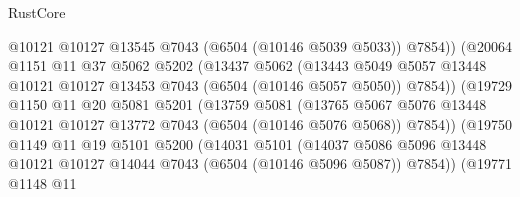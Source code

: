 \begin{lexlean}{RustCore}
\begin{coremodule}
                                @10121
                                @10127
                                @13545
                                @7043
                                (@6504 (@10146 @5039 @5033))
                                @7854))
                            (@20064
                              @1151
                              @11
                              @37
                              @5062
                              @5202
                              (@13437
                                @5062
                                (@13443
                                  @5049
                                  @5057
                                  @13448
                                  @10121
                                  @10127
                                  @13453
                                  @7043
                                  (@6504 (@10146 @5057 @5050))
                                  @7854))
                              (@19729
                                @1150
                                @11
                                @20
                                @5081
                                @5201
                                (@13759
                                  @5081
                                  (@13765
                                    @5067
                                    @5076
                                    @13448
                                    @10121
                                    @10127
                                    @13772
                                    @7043
                                    (@6504 (@10146 @5076 @5068))
                                    @7854))
                                (@19750
                                  @1149
                                  @11
                                  @19
                                  @5101
                                  @5200
                                  (@14031
                                    @5101
                                    (@14037
                                      @5086
                                      @5096
                                      @13448
                                      @10121
                                      @10127
                                      @14044
                                      @7043
                                      (@6504 (@10146 @5096 @5087))
                                      @7854))
                                  (@19771
                                    @1148
                                    @11

\end{coremodule}
\end{lexlean}
